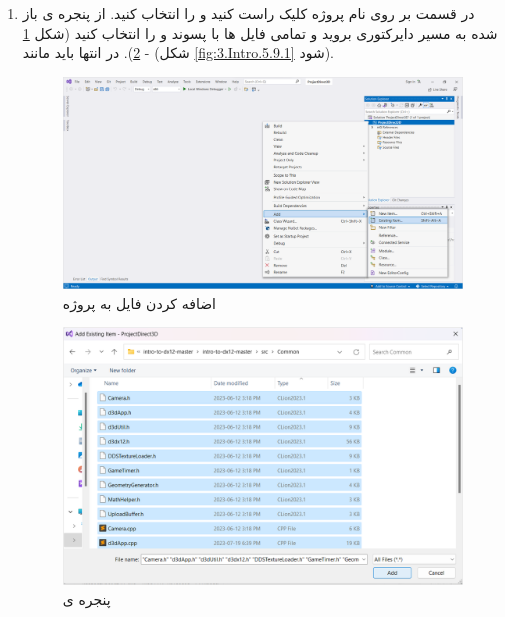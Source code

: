 {\begin{spacing}{1.5}
\begin{enumerate}
            \item {در قسمت  بر روی نام پروژه کلیک راست کنید و  را انتخاب کنید.
            از پنجره ی باز شده به مسیر دایرکتوری  بروید و تمامی فایل ها با پسوند  و  را انتخاب کنید  (شکل \ref{fig:3.Intro.5.9.2} - \ref{fig:3.Intro.5.9.3}).
            در انتها باید مانند (شکل \ref{fig:3.Intro.5.9.1} شود).
                \begin{figure}[H]
                    \centering
                    \setlength{\belowcaptionskip}{-10pt}
                    \includegraphics[width=\textwidth]{Images/3/3.Intro.5.9.2}
                    \caption{اضافه کردن فایل به پروژه}
                    \label{fig:3.Intro.5.9.2}
                \end{figure}

                \begin{figure}[H]
                    \centering
                    \setlength{\belowcaptionskip}{-10pt}
                    \includegraphics[width=\textwidth]{Images/3/3.Intro.5.9.3}
                    \caption{پنجره ی }
                    \label{fig:3.Intro.5.9.3}
                \end{figure}
            }


\end{enumerate}
\end{spacing}}
